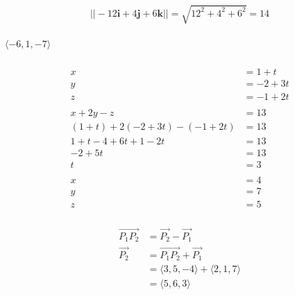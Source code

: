 \documentclass{article}
\begin{document}
\setcounter{subsubsection}{14}
\subsubsection{}

\[||-12 \mathbf{i} + 4 \mathbf{j} + 6 \mathbf{k}|| = \sqrt{12^2 + 4^2 + 6^2} = 14\]

\setcounter{subsubsection}{16}
\subsubsection{}

$\langle -6, 1, -7 \rangle$

\setcounter{subsubsection}{18}
\subsubsection{}

\begin{align*}
  x                                   & = 1 + t    \\
  y                                   & = -2 + 3 t \\
  z                                   & = -1 + 2 t \\ \\
  x + 2 y - z                         & = 13       \\
  (1 + t) + 2 (-2 + 3 t) - (-1 + 2 t) & = 13       \\
  1 + t - 4 + 6 t + 1 - 2 t           & = 13       \\
  -2 + 5 t                            & = 13       \\
  t                                   & = 3        \\ \\
  x                                   & = 4        \\
  y                                   & = 7        \\
  z                                   & = 5
\end{align*}

\setcounter{subsubsection}{20}
\subsubsection{}

\begin{align*}
  \overrightarrow{P_1 P_2} & = \overrightarrow{P_2} - \overrightarrow{P_1}        \\
  \overrightarrow{P_2}     & = \overrightarrow{P_1 P_2} + \overrightarrow{P_1}    \\
                           & = \langle 3, 5, -4 \rangle + \langle 2, 1, 7 \rangle \\
                           & = \langle 5, 6, 3 \rangle
\end{align*}
\end{document}
